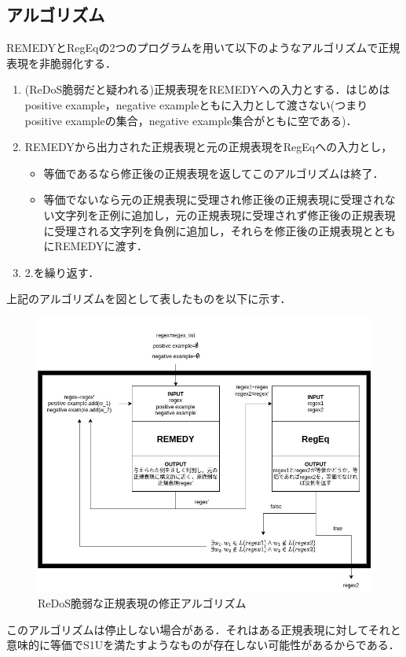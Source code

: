 \documentclass[a4paper, 12pt, dvipdfmx, uplatex]{jsreport}
\begin{document}
\subsection{アルゴリズム}
REMEDYとRegEqの2つのプログラムを用いて以下のようなアルゴリズムで正規表現を非脆弱化する．
\begin{enumerate}
  \item (ReDoS脆弱だと疑われる)正規表現をREMEDYへの入力とする．はじめはpositive example，negative exampleともに入力として渡さない(つまりpositive exampleの集合，negative example集合がともに空である)．
  \item REMEDYから出力された正規表現と元の正規表現をRegEqへの入力とし，
  \begin{itemize}
    \item 等価であるなら修正後の正規表現を返してこのアルゴリズムは終了．
    \item 等価でないなら元の正規表現に受理され修正後の正規表現に受理されない文字列を正例に追加し，元の正規表現に受理されず修正後の正規表現に受理される文字列を負例に追加し，それらを修正後の正規表現とともにREMEDYに渡す．
  \end{itemize}
  \item 2.を繰り返す．
\end{enumerate}

上記のアルゴリズムを図として表したものを以下に示す．

\begin{figure}[H] %
  \centering
  \includegraphics[width=\linewidth]{../figures/algorithm.jpg}
  \caption{ReDoS脆弱な正規表現の修正アルゴリズム\label{repair}}
\end{figure}


このアルゴリズムは停止しない場合がある．それはある正規表現に対してそれと意味的に等価でS1Uを満たすようなものが存在しない可能性があるからである．








\end{document}
